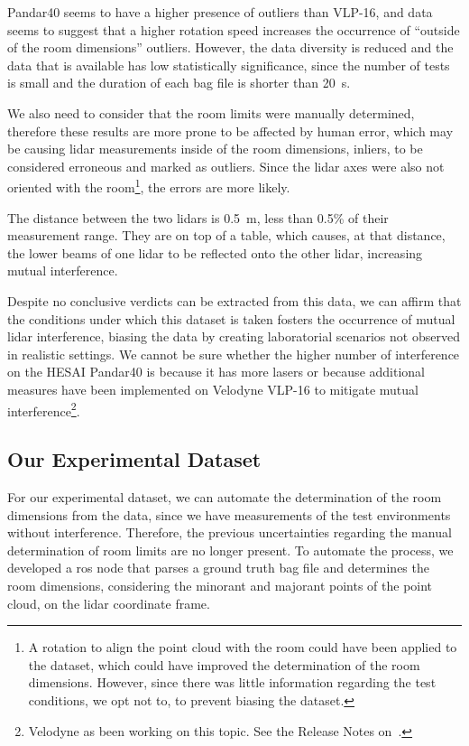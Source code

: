 Pandar40 seems to have a higher presence of outliers than VLP-16, and data seems to suggest that a higher rotation speed increases the occurrence of ``outside of the room dimensions'' outliers. However, the data diversity is reduced and the data that is available has low statistically significance, since the number of tests is small and the duration of each bag file is shorter than \SI{20}{\second}.

We also need to consider that the room limits were manually determined, therefore these results are more prone to be affected by human error, which may be causing \ac{lidar} measurements inside of the room dimensions, inliers, to be considered erroneous and marked as outliers. Since the \ac{lidar} axes were also not oriented with the room\footnote{A rotation to align the point cloud with the room could have been applied to the dataset, which could have improved the determination of the room dimensions. However, since there was little information regarding the test conditions, we opt not to, to prevent biasing the dataset.}, the errors are more likely. 

The distance between the two \acp{lidar} is \SI{0.5}{\meter}, less than 0.5\% of their measurement range. They are on top of a table, which causes, at that distance, the lower beams of one \ac{lidar} to be reflected onto the other \ac{lidar}, increasing mutual interference.

Despite no conclusive verdicts can be extracted from this data, we can affirm that the conditions under which this dataset is taken fosters the occurrence of mutual \ac{lidar} interference, biasing the data by creating laboratorial scenarios not observed in realistic settings. We cannot be sure whether the higher number of interference on the HESAI Pandar40 is because it has more lasers or because additional measures have been implemented on Velodyne VLP-16 to mitigate mutual interference\footnote{Velodyne as been working on this topic. See the Release Notes on~\cite{VLP16}.}. 

\subsection{Our Experimental Dataset}
\label{subsec:lidar-interference:room-outliers-experimental-setup}
For our experimental dataset, we can automate the determination of the room dimensions from the data, since we have measurements of the test environments without interference. Therefore, the previous uncertainties regarding the manual determination of room limits are no longer present. To automate the process, we developed a \ac{ros} node that parses a ground truth bag file and determines the room dimensions, considering the minorant and majorant points of the point cloud, on the \ac{lidar} coordinate frame. 

